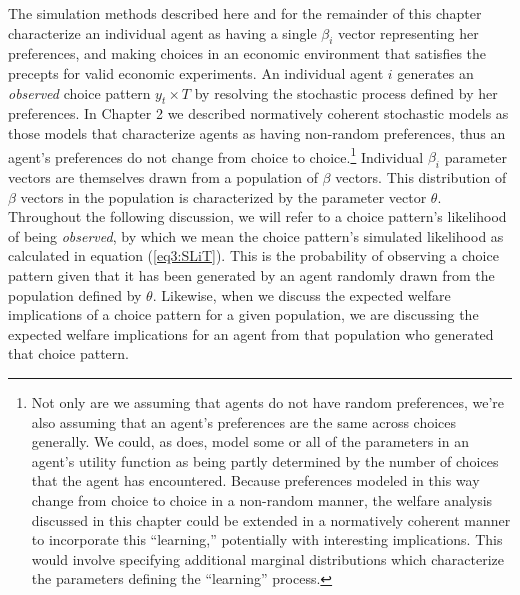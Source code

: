 \documentclass[../main.tex]{subfiles}
\begin{document}
The simulation methods described here and for the remainder of this chapter characterize an individual agent as having a single $\beta_i$ vector representing her preferences, and making choices in an economic environment that satisfies the \textcite{Smith1982} precepts for valid economic experiments.
An individual agent $i$ generates an \textit{observed} choice pattern $y_t \times T$ by resolving the stochastic process defined by her preferences.
In Chapter 2 we described normatively coherent stochastic models as those models that characterize agents as having non-random preferences, thus an agent's preferences do not change from choice to choice.\footnote{
	Not only are we assuming that agents do not have random preferences, we're also assuming that an agent's preferences are the same across choices generally.
	We could, as \textcite{Hey2001} does, model some or all of the parameters in an agent's utility function as being partly determined by the number of choices that the agent has encountered.
	Because preferences modeled in this way change from choice to choice in a non-random manner, the welfare analysis discussed in this chapter could be extended in a normatively coherent manner to incorporate this \enquote{learning,} potentially with interesting implications.
	This would involve specifying additional marginal distributions which characterize the parameters defining the \enquote{learning} process.
}
Individual $\beta_i$ parameter vectors are themselves drawn from a population of $\beta$ vectors.
This distribution of $\beta$ vectors in the population is characterized by the parameter vector $\theta$.
Throughout the following discussion, we will refer to a choice pattern's likelihood of being \textit{observed}, by which we mean the choice pattern's simulated likelihood as calculated in equation (\ref{eq3:SLiT}).
This is the probability of observing a choice pattern given that it has been generated by an agent randomly drawn from the population defined by $\theta$.
Likewise, when we discuss the expected welfare implications of a choice pattern for a given population, we are discussing the expected welfare implications for an agent from that population who generated that choice pattern.
\end{document}
